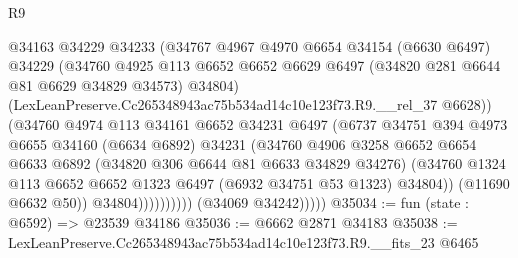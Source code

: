 \begin{lexlean}{R9}
\begin{coremodule}
                              @34163
                              @34229
                              @34233
                              (@34767
                                @4967
                                @4970
                                @6654
                                @34154
                                (@6630 @6497)
                                @34229
                                (@34760
                                  @4925
                                  @113
                                  @6652
                                  @6652
                                  @6629
                                  @6497
                                  (@34820 @281 @6644 @81 @6629 @34829 @34573)
                                  @34804)
                                (LexLeanPreserve.Cc265348943ac75b534ad14c10e123f73.R9.__rel_37
                                  @6628))
                              (@34760
                                @4974
                                @113
                                @34161
                                @6652
                                @34231
                                @6497
                                (@6737
                                  @34751
                                  @394
                                  @4973
                                  @6655
                                  @34160
                                  (@6634 @6892)
                                  @34231
                                  (@34760
                                    @4906
                                    @3258
                                    @6652
                                    @6654
                                    @6633
                                    @6892
                                    (@34820 @306 @6644 @81 @6633 @34829 @34276)
                                    (@34760
                                      @1324
                                      @113
                                      @6652
                                      @6652
                                      @1323
                                      @6497
                                      (@6932 @34751 @53 @1323)
                                      @34804))
                                  (@11690 @6632 @50))
                                @34804))))))))))
            (@34069 @34242)))))
@35034 := fun (state : @6592) => @23539 @34186
@35036 := @6662 @2871 @34183
@35038 := LexLeanPreserve.Cc265348943ac75b534ad14c10e123f73.R9.__fits_23 @6465

\end{coremodule}
\end{lexlean}
